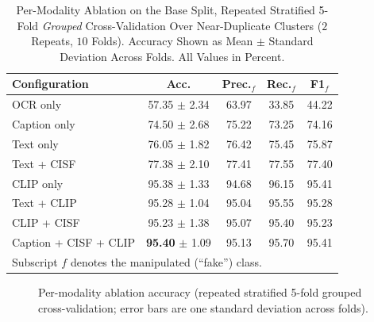 \documentclass[conference,a4paper]{IEEEtran}
\begin{document}
\begin{table}[!tb]
\caption{Per-Modality Ablation on the Base Split, Repeated Stratified 5-Fold
\emph{Grouped} Cross-Validation Over Near-Duplicate Clusters ($2$ Repeats,
$10$ Folds). Accuracy Shown as Mean $\pm$ Standard Deviation Across Folds.
All Values in Percent.}
\label{tab:ablation}
\centering
\setlength{\tabcolsep}{3.5pt}
\begin{tabular}{lcccc}
\toprule
\textbf{Configuration} & \textbf{Acc.} & \textbf{Prec.$_{f}$} &
\textbf{Rec.$_{f}$} & \textbf{F1$_{f}$} \\
\midrule
OCR only              & 57.35 $\pm$ 2.34 & 63.97 & 33.85 & 44.22 \\
Caption only          & 74.50 $\pm$ 2.68 & 75.22 & 73.25 & 74.16 \\
Text only             & 76.05 $\pm$ 1.82 & 76.42 & 75.45 & 75.87 \\
Text + CISF           & 77.38 $\pm$ 2.10 & 77.41 & 77.55 & 77.40 \\
\midrule
CLIP only             & 95.38 $\pm$ 1.33 & 94.68 & 96.15 & 95.41 \\
Text + CLIP           & 95.28 $\pm$ 1.04 & 95.04 & 95.55 & 95.28 \\
CLIP + CISF           & 95.23 $\pm$ 1.38 & 95.07 & 95.40 & 95.23 \\
Caption + CISF + CLIP & \textbf{95.40} $\pm$ 1.09 & 95.13 & 95.70 & 95.41 \\
\bottomrule
\multicolumn{5}{l}{\footnotesize Subscript $f$ denotes the manipulated
(``fake'') class.}
\end{tabular}
\end{table}

\begin{figure}[!tb]
\centering
{}
\caption{Per-modality ablation accuracy (repeated stratified 5-fold grouped
cross-validation; error bars are one standard deviation across folds).}
\label{fig:ablation}
\end{figure}
\end{document}
